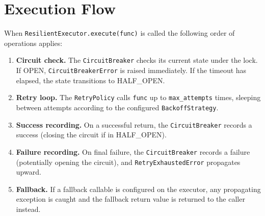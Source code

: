 \section{Execution Flow}
\label{sec:execution-flow}

When \texttt{ResilientExecutor.execute(func)} is called the following
order of operations applies:

\begin{enumerate}[leftmargin=*, label=\arabic*.]
    \item \textbf{Circuit check.} The \texttt{CircuitBreaker} checks its
          current state under the lock.  If OPEN, \texttt{CircuitBreakerError}
          is raised immediately.  If the timeout has elapsed, the state
          transitions to HALF\_OPEN.
    \item \textbf{Retry loop.} The \texttt{RetryPolicy} calls \texttt{func}
          up to \texttt{max\_attempts} times, sleeping between attempts
          according to the configured \texttt{BackoffStrategy}.
    \item \textbf{Success recording.} On a successful return, the
          \texttt{CircuitBreaker} records a success (closing the circuit if
          in HALF\_OPEN).
    \item \textbf{Failure recording.} On final failure, the
          \texttt{CircuitBreaker} records a failure (potentially opening
          the circuit), and \texttt{RetryExhaustedError} propagates upward.
    \item \textbf{Fallback.} If a fallback callable is configured on the
          executor, any propagating exception is caught and the fallback
          return value is returned to the caller instead.
\end{enumerate}
